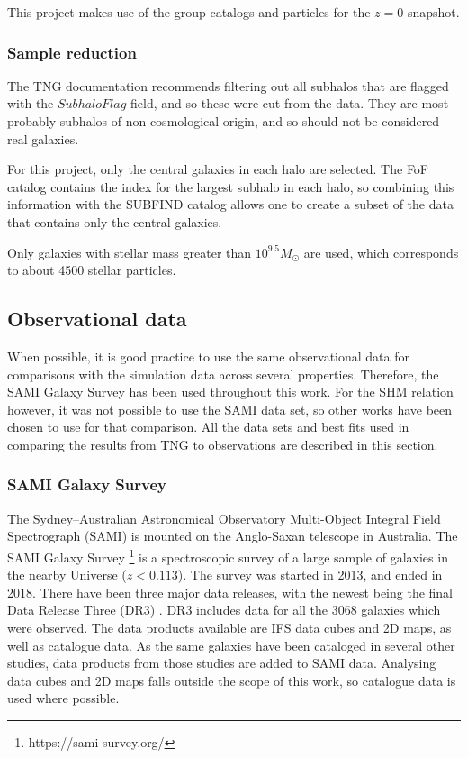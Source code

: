 This project makes use of the group catalogs and particles for the $z=0$ snapshot.

\subsubsection{Sample reduction}

The TNG documentation recommends filtering out all subhalos that are flagged with the $SubhaloFlag$ field, and so these were cut from the data. They are most probably subhalos of non-cosmological origin, and so should not be considered real galaxies.

For this project, only the central galaxies in each halo are selected. The FoF catalog contains the index for the largest subhalo in each halo, so combining this information with the SUBFIND catalog allows one to create a subset of the data that contains only the central galaxies.

Only galaxies with stellar mass greater than $10^{9.5} M_{\odot}$ are used, which corresponds to about 4500 stellar particles.

\subsection{Observational data}
When possible, it is good practice to use the same observational data for comparisons with the simulation data across several properties. Therefore, the SAMI Galaxy Survey \parencite{Bryant2015} has been used throughout this work. For the SHM relation however, it was not possible to use the SAMI data set, so other works have been chosen to use for that comparison. All the data sets and best fits used in comparing the results from TNG to observations are described in this section.

\subsubsection{SAMI Galaxy Survey}
The Sydney–Australian Astronomical Observatory Multi-Object Integral Field Spectrograph (SAMI) is mounted on the Anglo-Saxan telescope in Australia. The SAMI Galaxy Survey \footnote{https://sami-survey.org/} is a spectroscopic survey of a large sample of galaxies in the nearby Universe ($z < 0.113$). The survey was started in 2013, and ended in 2018. There have been three major data releases, with the newest being the final Data Release Three (DR3) \parencite{Scott2021}. DR3 includes data for all the 3068 galaxies which were observed. The data products available are IFS data cubes and 2D maps, as well as catalogue data. As the same galaxies have been cataloged in several other studies, data products from those studies are added to SAMI data. Analysing data cubes and 2D maps falls outside the scope of this work, so catalogue data is used where possible. 

